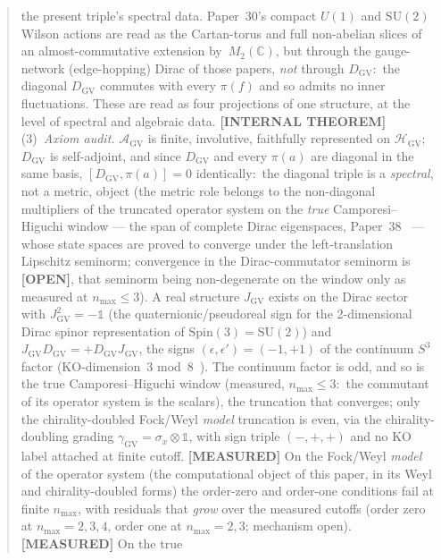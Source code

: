 \documentclass[11pt]{article}
\begin{document}
\begin{abstract}
the present triple's spectral data.  Paper~30's compact $U(1)$ and
$\mathrm{SU}(2)$ Wilson actions are read as the Cartan-torus
and full non-abelian slices of an almost-commutative extension
by~$M_2(\mathbb{C})$, but through the gauge-network (edge-hopping)
Dirac of those papers, \emph{not} through $D_{\mathrm{GV}}$:\ the
diagonal $D_{\mathrm{GV}}$ commutes with every $\pi(f)$ and so admits
no inner fluctuations.  These are read as four projections
of one structure, at the level of spectral and algebraic data.
\textbf{[INTERNAL THEOREM]}
(3)~\emph{Axiom audit.}  $\mathcal{A}_{\mathrm{GV}}$ is finite,
involutive, faithfully represented on $\mathcal{H}_{\mathrm{GV}}$;
$D_{\mathrm{GV}}$ is self-adjoint, and since $D_{\mathrm{GV}}$ and
every $\pi(a)$ are diagonal in the same basis,
$[D_{\mathrm{GV}}, \pi(a)] = 0$ identically:\ the diagonal triple is a
\emph{spectral}, not a metric, object (the metric role belongs to the
non-diagonal multipliers of the truncated operator system on the
\emph{true} Camporesi--Higuchi window --- the span of complete Dirac
eigenspaces, Paper~38~\cite{loutey_paper38} --- whose state spaces are
proved to converge under the left-translation Lipschitz seminorm;
convergence in the Dirac-commutator seminorm is \textbf{[OPEN]}, that
seminorm being non-degenerate on the window only as measured at
$n_{\max} \le 3$).  A
real structure $J_{\mathrm{GV}}$ exists on the Dirac sector with
$J_{\mathrm{GV}}^2 = -\mathbb{1}$ (the quaternionic/pseudoreal sign
for the 2-dimensional Dirac spinor representation of
$\mathrm{Spin}(3) = \mathrm{SU}(2)$) and $J_{\mathrm{GV}} D_{\mathrm{GV}}
= +D_{\mathrm{GV}} J_{\mathrm{GV}}$, the signs
$(\epsilon, \epsilon') = (-1, +1)$ of the continuum $S^3$ factor
($\mathrm{KO}$-dimension~$3$ mod~$8$~\cite{connes1995}).  The continuum
factor is odd, and so is the true Camporesi--Higuchi window
(measured, $n_{\max} \le 3$:\ the commutant of its operator
system is the scalars), the truncation that converges; only
the chirality-doubled Fock/Weyl \emph{model} truncation is even, via the
chirality-doubling grading $\gamma_{\mathrm{GV}} = \sigma_x \otimes
\mathbb{1}$, with sign triple $(-,+,+)$ and no $\mathrm{KO}$ label
attached at finite cutoff.  \textbf{[MEASURED]} On the Fock/Weyl
\emph{model} of the operator system (the computational object of this
paper, in its Weyl and chirality-doubled forms) the order-zero and order-one conditions
fail at finite $n_{\max}$, with residuals that \emph{grow} over the
measured cutoffs (order zero at $n_{\max} = 2, 3, 4$, order one at
$n_{\max} = 2, 3$; mechanism open).  \textbf{[MEASURED]} On the true

\end{abstract}
\end{document}
